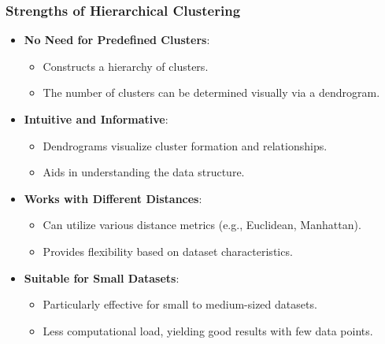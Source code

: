 \documentclass[aspectratio=169]{beamer}
\begin{document}
\begin{frame}[fragile]
    \frametitle{Strengths of Hierarchical Clustering}
    
    \begin{itemize}
        \item \textbf{No Need for Predefined Clusters}:
        \begin{itemize}
            \item Constructs a hierarchy of clusters.
            \item The number of clusters can be determined visually via a dendrogram.
        \end{itemize}
        
        \item \textbf{Intuitive and Informative}:
        \begin{itemize}
            \item Dendrograms visualize cluster formation and relationships.
            \item Aids in understanding the data structure.
        \end{itemize}
        
        \item \textbf{Works with Different Distances}:
        \begin{itemize}
            \item Can utilize various distance metrics (e.g., Euclidean, Manhattan).
            \item Provides flexibility based on dataset characteristics.
        \end{itemize}
        
        \item \textbf{Suitable for Small Datasets}:
        \begin{itemize}
            \item Particularly effective for small to medium-sized datasets.
            \item Less computational load, yielding good results with few data points.
        \end{itemize}
    \end{itemize}
\end{frame}
\end{document}
